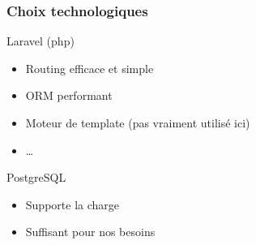 
\begin{frame}
\frametitle{Choix technologiques}
  \begin{block}{Laravel (php)}
    \begin{itemize}
     \item Routing efficace et simple
     \item ORM performant
     \item Moteur de template (pas vraiment utilisé ici)
     \item \dots
    \end{itemize}    
  \end{block}
  
  \begin{block}{PostgreSQL}
    \begin{itemize}
      \item Supporte la charge
      \item Suffisant pour nos besoins
    \end{itemize}    
  \end{block}
\end{frame}

